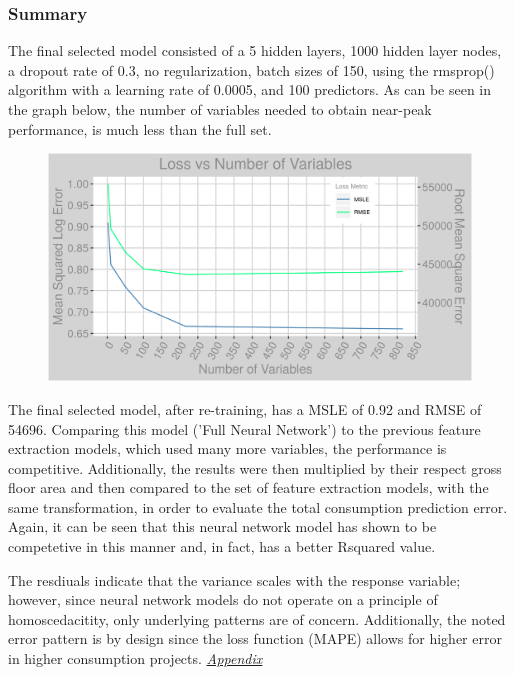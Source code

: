 \subsubsection{Summary}
The final selected model consisted of a 5 hidden layers, 1000 hidden layer nodes, a dropout rate of 0.3, no regularization, batch sizes of 150, using the rmsprop() algorithm with a learning rate of 0.0005, and 100 predictors.  As can be seen in the graph below, the number of variables needed to obtain near-peak performance, is much less than the full set.

\begin{figure}[h]
\centering
\includegraphics[width=\textwidth, height=0.25\textheight]{Images/electricity_psf_nn_error.png}
\end{figure}

The final selected model, after re-training, has a MSLE of 0.92 and RMSE of 54696.  Comparing this model ('Full Neural Network') to the previous feature extraction models, which used many more variables, the performance is competitive.  Additionally, the results were then multiplied by their respect gross floor area and then compared to the set of feature extraction models, with the same transformation, in order to evaluate the total consumption prediction error.  Again, it can be seen that this neural network model has shown to be competetive in this manner and, in fact, has a better Rsquared value.

The resdiuals indicate that the variance scales with the response variable; however, since neural network models do not operate on a principle of homoscedacitity, only underlying patterns are of concern. Additionally, the noted error pattern is by design since the loss function (MAPE) allows for higher error in higher consumption projects.  \textit{\hyperref[appendix_nn:electricity:nn_full]{Appendix}}

